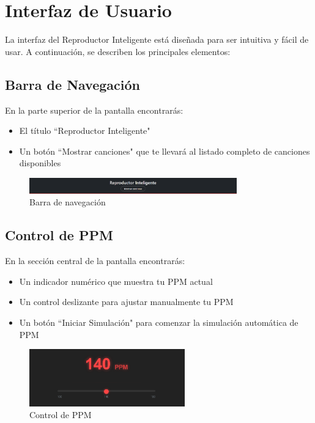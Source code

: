 \documentclass[a4paper,12pt]{article}
\begin{document}
\section{Interfaz de Usuario}
La interfaz del Reproductor Inteligente está diseñada para ser intuitiva y fácil de usar. A continuación, se describen los principales elementos:

\subsection{Barra de Navegación}
En la parte superior de la pantalla encontrarás:
\begin{itemize}
    \item El título ``Reproductor Inteligente"
    \item Un botón ``Mostrar canciones" que te llevará al listado completo de canciones disponibles
\end{itemize}

 \begin{figure}[h]
     \centering
     \includegraphics[width=0.8\textwidth]{imagenes/barra_navegacion.png}
     \caption{Barra de navegación}
 \end{figure}

\subsection{Control de PPM}
En la sección central de la pantalla encontrarás:
\begin{itemize}
    \item Un indicador numérico que muestra tu PPM actual
    \item Un control deslizante para ajustar manualmente tu PPM
    \item Un botón ``Iniciar Simulación" para comenzar la simulación automática de PPM
\end{itemize}

 \begin{figure}[h]
     \centering
     \includegraphics[width=0.6\textwidth]{imagenes/control_ppm.png}
     \caption{Control de PPM}
 \end{figure}
\end{document}
